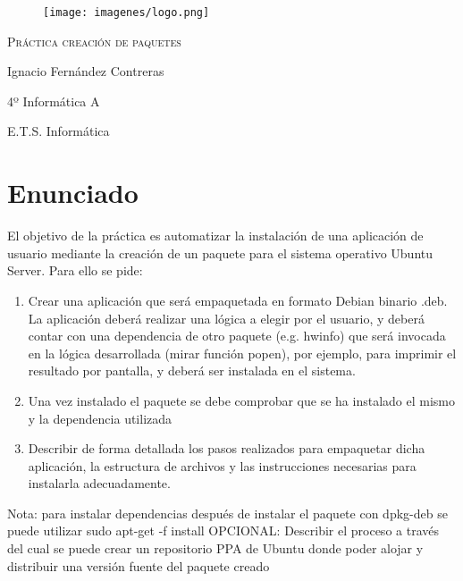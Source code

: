 \documentclass{article}
\begin{document}
\begin{titlepage}
\centering
\begin{figure}
\centering
 
\vspace{5cm}
\centering
\begin{Huge}
\begin{center}

\texttt{[image: imagenes/logo.png]} 

\vspace{1cm}
\end{center}

\end{Huge}
\end{figure}


 {\scshape\Large Práctica creación de paquetes\par}
\vspace{9cm}

{\Large Ignacio Fernández Contreras\par}
{\Large 4º Informática A\par}
\vspace{0.5cm}
{\large E.T.S. Informática}
\vfill

\end{titlepage}
\clearpage\hbox{}\thispagestyle{empty}\newpage


 \newpage
\section{Enunciado}
\begin{flushleft}
El objetivo de la práctica es automatizar la instalación de una aplicación de usuario mediante
la creación de un paquete para el sistema operativo Ubuntu Server. Para ello se pide:
\begin{enumerate}
\item Crear una aplicación que será empaquetada en formato Debian binario .deb. La
aplicación deberá realizar una lógica a elegir por el usuario, y deberá contar con una
dependencia de otro paquete (e.g. hwinfo) que será invocada en la lógica desarrollada
(mirar función popen), por ejemplo, para imprimir el resultado por pantalla, y deberá
ser instalada en el sistema.
\item  Una vez instalado el paquete se debe comprobar que se ha instalado el mismo y la
dependencia utilizada
\item  Describir de forma detallada los pasos realizados para empaquetar dicha aplicación, la
estructura de archivos y las instrucciones necesarias para instalarla adecuadamente.
\end{enumerate}
Nota: para instalar dependencias después de instalar el paquete con dpkg-deb se puede utilizar sudo apt-get -f install
OPCIONAL: Describir el proceso a través del cual se puede crear un repositorio PPA de
Ubuntu donde poder alojar y distribuir una versión fuente del paquete creado
\end{flushleft}
\end{document}
